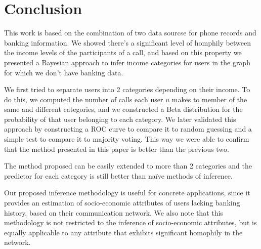 \section{Conclusion}

This work is based on the combination of two data sourcse for phone records and banking information. We showed there's a significant level of homphily between the income levels of the participants of a call, and based on this property we presented a Bayesian approach to infer income categories for users in the graph for which we don't have banking data.

We first tried to separate users into 2 categories depending on their income. To do this, we computed the number of calls each user \( u \) makes to member of the same and different categories, and we constructed a Beta distribution for the probability of that user belonging to each category. We later validated this approach by constructing a ROC curve to compare it to random guessing and a simple test to compare it to majority voting. This way we were able to confirm that the method presented in this paper is better than the previous two.

The method proposed can be easily extended to more than 2 categories and the predictor for each category is still better than naïve methods of inference.

Our proposed inference methodology is useful for concrete applications, since it provides an estimation of socio-economic attributes of users lacking banking history, based on their communication network. We also note that this methodology is not restricted to the inference of socio-economic attributes, but is equally applicable to any attribute that exhibits significant homophily in the network.

%
%
%
%
%
%


